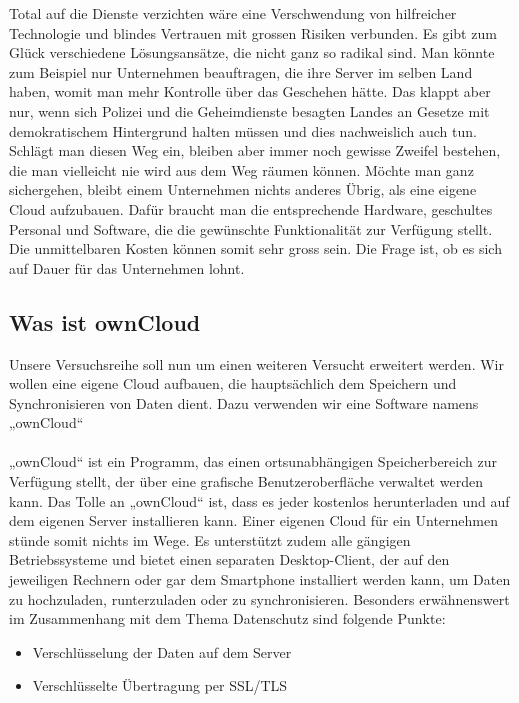 Total auf die Dienste verzichten wäre eine Verschwendung von hilfreicher Technologie und blindes Vertrauen mit grossen Risiken verbunden. Es gibt zum Glück verschiedene Lösungsansätze, die nicht ganz so radikal sind. Man könnte zum Beispiel nur Unternehmen beauftragen, die ihre Server im selben Land haben, womit man mehr Kontrolle über das Geschehen hätte. Das klappt aber nur, wenn sich Polizei und die Geheimdienste besagten Landes an Gesetze mit demokratischem Hintergrund halten müssen und dies nachweislich auch tun. Schlägt man diesen Weg ein, bleiben aber immer noch gewisse Zweifel bestehen, die man vielleicht nie wird aus dem Weg räumen können. Möchte man ganz sichergehen, bleibt einem Unternehmen nichts anderes Übrig, als eine eigene Cloud aufzubauen. Dafür braucht man die entsprechende Hardware, geschultes Personal und   Software, die die gewünschte Funktionalität zur Verfügung stellt. Die unmittelbaren Kosten können somit sehr gross sein. Die Frage ist, ob es sich auf Dauer für das Unternehmen lohnt.

\subsection{Was ist ownCloud}
Unsere Versuchsreihe soll nun um einen weiteren Versucht erweitert werden. Wir wollen eine eigene Cloud aufbauen, die hauptsächlich dem Speichern und Synchronisieren von Daten dient. Dazu verwenden wir eine Software namens „ownCloud“
\\
\\
„ownCloud“ ist ein Programm, das einen ortsunabhängigen Speicherbereich zur Verfügung stellt, der über eine grafische Benutzeroberfläche verwaltet werden kann. Das Tolle an „ownCloud“ ist, dass es jeder kostenlos herunterladen und auf dem eigenen Server installieren kann. Einer eigenen Cloud für ein Unternehmen stünde somit nichts im Wege. Es unterstützt zudem alle gängigen Betriebssysteme und bietet einen separaten Desktop-Client, der auf den jeweiligen Rechnern oder gar dem Smartphone installiert werden kann, um Daten zu hochzuladen, runterzuladen oder zu synchronisieren.
Besonders erwähnenswert im Zusammenhang mit dem Thema Datenschutz sind folgende Punkte:
\begin{itemize}
\item Verschlüsselung der Daten auf dem Server
\item Verschlüsselte Übertragung per SSL/TLS
\end{itemize}

